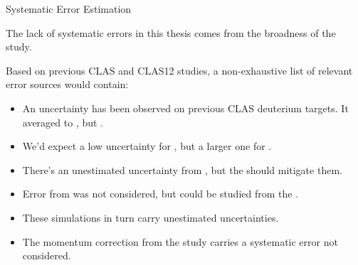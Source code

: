 \begin{frame}{Systematic Error Estimation}
    \label{12.12::systematic_error_estimation}

    The lack of systematic errors in this thesis comes from the broadness of the study.

    \vspace{6pt}

    Based on previous CLAS and CLAS12 studies, a non-exhaustive list of relevant error sources would contain:

    \vspace{6pt}
    \begin{itemize}
        \item
            An uncertainty has been observed on previous CLAS deuterium targets.
            It averaged to , but .

        \item
            We'd expect a low uncertainty for , but a larger one for \ef{$\pi^\pm$}.

        \item
            There's an unestimated uncertainty from , but the  should mitigate them.

        \item
            Error from  was not considered, but could be studied from the .

        \item
            These simulations in turn carry unestimated uncertainties.

        \item
            The momentum correction from the  study carries a systematic error not considered.
    \end{itemize}

\end{frame}
